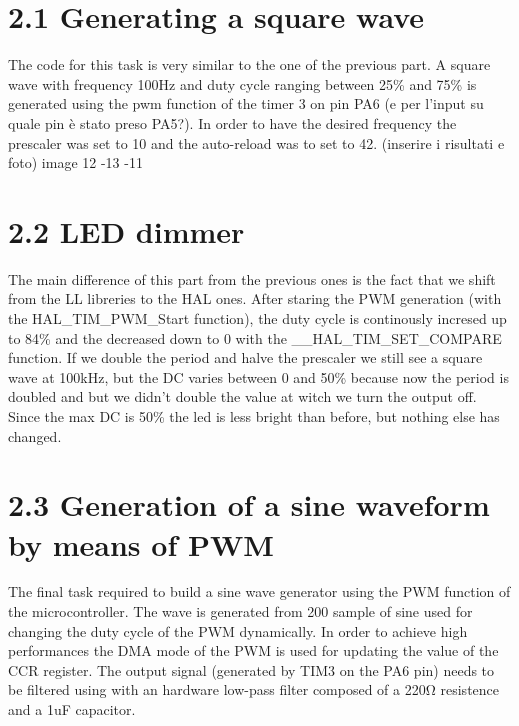 \documentclass[12pt]{article}
\begin{document}
\section*{2.1 Generating a square wave}
The code for this task is very similar to the one of the previous part. A square wave with frequency 100Hz and duty cycle ranging between 25\% and 75\% is generated using the pwm function of the timer 3 on pin PA6 (e per l'input su quale pin è stato preso PA5?). In order to have the desired frequency the prescaler was set to 10 and the auto-reload was to set to 42.
(inserire i risultati e foto)
image 12 -13 -11


\section*{2.2 LED dimmer}
The main difference of this part from the previous ones is the fact that we shift from the LL libreries to the HAL ones. After staring the PWM generation (with the HAL\_TIM\_PWM\_Start function), the duty cycle is continously incresed up to 84\% and the decreased down to 0 with the \_\_HAL\_TIM\_SET\_COMPARE function.
If we double the period and halve the prescaler we still see a square wave at 100kHz, but the DC varies between 0 and 50\% because now the period is doubled and but we didn't double the value at witch we turn the output off.\\
Since the max DC is 50\% the led is less bright than before, but nothing else has changed.
 
 \section*{2.3 Generation of a sine waveform by means of PWM }
 The final task required to build a sine wave generator using the PWM function of the microcontroller. The wave is generated from 200 sample of sine used for changing the duty cycle of the PWM dynamically. In order to achieve high performances the DMA mode of the PWM is used for updating the value of the CCR register. The output signal (generated by TIM3 on the PA6 pin) needs to be filtered using with an hardware low-pass filter composed of a 220Ω resistence and a 1uF capacitor.
\end{document}
